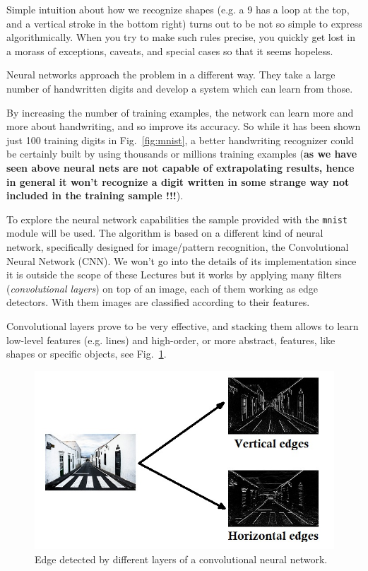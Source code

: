 Simple intuition about how we recognize shapes (e.g. a 9 has a loop at the top, and a vertical stroke in the bottom right) turns out to be not so simple to express algorithmically. When you try to make such rules precise, you quickly get lost in a morass of exceptions, caveats, and special cases so that it seems hopeless.

Neural networks approach the problem in a different way. They take a large number of handwritten digits and develop a system which can learn from those.

By increasing the number of training examples, the network can learn more and more about handwriting, and so improve its accuracy. So while it has been shown just 100 training digits in Fig.~\ref{fig:mnist}, a better handwriting recognizer could be certainly built by using thousands or millions training examples (\textbf{as we have seen above neural nets are not capable of extrapolating results, hence in general it won't recognize a digit written in some strange way not included in the training sample !!!}).

To explore the neural network capabilities the sample provided with the \texttt{mnist} module will be used. 
The algorithm is based on a different kind of neural network, specifically designed for image/pattern recognition, the Convolutional Neural Network (CNN). We won't go into the details of its implementation since it is outside the scope of these Lectures but it works by applying many filters (\emph{convolutional layers}) on top of an image, each of them working as edge detectors. With them images are classified according to their features.

Convolutional layers prove to be very effective, and stacking them allows to learn low-level features (e.g. lines) and high-order, or more abstract, features, like shapes or specific objects, see Fig.~\ref{fig:conv_filters}.

\begin{figure}[htb]
\centering
\includegraphics[width=1.\textwidth]{figures/edges.jpg}
\caption{Edge detected by different layers of a convolutional neural network.}
\label{fig:conv_filters}
\end{figure}

